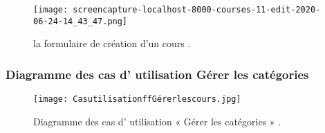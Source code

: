 
\begin{figure}[ht]
	\centering
	\texttt{[image: screencapture-localhost-8000-courses-11-edit-2020-06-24-14\_43\_47.png]}
	\caption{la formulaire de création d'un cours .}
	\label{fig: la formulaire de création un cours  }
\end{figure}
\FloatBarrier
\clearpage


\subsubsection{Diagramme des cas d' utilisation  Gérer les catégories }
\begin{figure}[ht]
	\centering
	\texttt{[image: CasutilisationffGérerlescours.jpg]}
	\caption{Diagramme des cas d' utilisation « Gérer les catégories » .}
	\label{fig:Diagramme des cas d' utilisation Gérer les catégories  }
\end{figure}
\FloatBarrier




